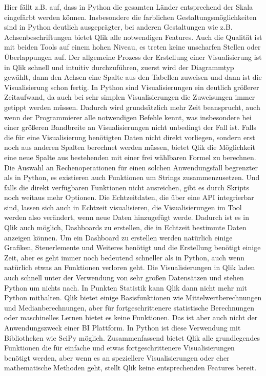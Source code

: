 \documentclass[12pt]{article}
\begin{document}
	Hier fällt z.B. auf, dass in Python die gesamten Länder entsprechend der Skala eingefärbt werden können.
	Insbesondere die farblichen Gestaltungsmöglichkeiten sind in Python deutlich ausgeprägter, bei anderen Gestaltungen wie z.B. Achsenbeschriftungen bietet Qlik alle notwendigen Features. Auch die Qualität ist mit beiden Tools auf einem hohen Niveau, es treten keine unscharfen Stellen oder Überlappungen auf. Der allgemeine Prozess der Erstellung einer Visualisierung ist in Qlik schnell und intuitiv durchzuführen, zuerst wird der Diagrammtyp gewählt, dann den Achsen eine Spalte aus den Tabellen zuweisen und dann ist die Visualisierung schon fertig. In Python sind Visualisierungen ein deutlich größerer Zeitaufwand, da auch bei sehr simplen Visualisierungen die Zuweisungen immer getippt werden müssen. Dadurch wird grundsätzlich mehr Zeit beansprucht, auch wenn der Programmierer alle notwendigen Befehle kennt, was insbesondere bei einer größeren Bandbreite an Visualisierungen nicht unbedingt der Fall ist. Falls die für eine Visualisierung benötigten Daten nicht direkt vorliegen, sondern erst noch aus anderen Spalten berechnet werden müssen, bietet Qlik die Möglichkeit eine neue Spalte aus bestehenden mit einer frei wählbaren Formel zu berechnen. Die Auswahl an Rechenoperationen für einen solchen Anwendungsfall begrenzter als in Python, es existieren auch Funktionen um Strings zusammenzusetzen. Und falls die direkt verfügbaren Funktionen nicht ausreichen, gibt es durch Skripts noch weitaus mehr Optionen.
	Die Echtzeitdaten, die über eine API integrierbar sind, lassen sich auch in Echtzeit visualisieren, die Visualisierungen im Tool werden also verändert, wenn neue Daten hinzugefügt werde. Dadurch ist es in Qlik auch möglich, Dashboards zu erstellen, die in Echtzeit bestimmte Daten anzeigen können. Um ein Dashboard zu erstellen werden natürlich einige Grafiken, Steuerlemente und Weiteres benötigt und die Erstellung benötigt einige Zeit, aber es geht immer noch bedeutend schneller als in Python, auch wenn natürlich etwas an Funktionen verloren geht.
	Die Visualisierungen in Qlik laden auch schnell unter der Verwendung von sehr großen Datensätzen und stehen Python um nichts nach.
	In Punkten Statistik kann Qlik dann nicht mehr mit Python mithalten. Qlik bietet einige Basisfunktionen wie Mittelwertberechnungen und Medianberechnungen, aber für fortgeschrittenere statistische Berechnungen oder maschinelles Lernen bietet es keine Funktionen. Das ist aber auch nicht der Anwendungszweck einer BI Plattform. In Python ist diese Verwendung mit Bibliotheken wie SciPy möglich.
	Zusammenfassend bietet Qlik alle grundlegendes Funktionen die für einfache und etwas fortgeschrittenere Visualisierungen benötigt werden, aber wenn es an speziellere Visualisierungen oder eher mathematische Methoden geht, stellt Qlik keine entsprechenden Features bereit.
	
\end{document}
